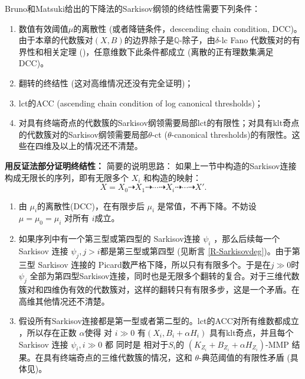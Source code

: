 Bruno和Matsuki\cite{brunoLogSarkisovProgram1995}给出的下降法的Sarkisov纲领的终结性需要下列条件：
\begin{enumerate}
  \item 数值有效阈值$\mu$的离散性 (或者降链条件，descending chain condition, DCC)。由于本章的代数簇对$(X,B)$的边界除子是$\mathbb{Q}$-除子，由$\delta$-lc Fano 代数簇对的有界性和相关定理 (\cite[Theorem 1.1]{birkarSingularitiesLinearSystems2020})，任意维数下此条件都成立 (离散的正有理数集满足DCC)。
  \item 翻转的终结性 (这对高维情况还没有完全证明)； 
  \item lct的ACC (ascending chain condition of log canonical thresholds)；
  \item 对具有终端奇点的代数簇的Sarkisov纲领需要局部lct的有限性；对具有klt奇点的代数簇对的Sarkisov纲领需要局部$\theta$-ct ($\theta$-canonical thresholds)的有限性。这些在四维及以上的情况还不清楚。
\end{enumerate}
\textbf{用反证法部分证明终结性： }
简要的说明思路： 如果上一节中构造的Sarkisov连接构成无限长的序列，即有无限多个 $ X_i $ 和构造的映射：
\[ X=X_0\dashrightarrow X_1\dashrightarrow \cdots\dashrightarrow X_i \dashrightarrow\cdots\dashrightarrow X'.\]
\begin{enumerate}
  \item 由 $\mu_{i}$的离散性(DCC)，在有限步后 $\mu_{i}$ 是常值，不再下降。不妨设 $\mu=\mu_{0}=\mu_{i}$ 对所有 $i$成立。
  \item 如果序列中有一个第三型或第四型的 Sarkisov连接 $\psi_i$ ，那么后续每一个 Sarkisov 连接 $\psi_j, j>i$都是第三型或第四型 (见断言 \ref{R-Sarkisovdeg})。由于第三型 Sarkisov 连接的 Picard数严格下降，所以只有有限多个。于是在$j\gg 0$时 $\psi_j$ 全部为第四型Sarkisov连接，同时也是无限多个翻转的复合。对于三维代数簇对和四维伪有效的代数簇对，这样的翻转只有有限多步，这是一个矛盾。在高维其他情况还不清楚。
  \item 假设所有Sarkisov连接都是第一型或者第二型的。lct的ACC对所有维数都成立 \cite{HMX14}，所以存在正数 $\alpha$使得 对 $i\gg 0$ 有$(X_i,B_i+\alpha H_i)$ 具有klt奇点，并且每个Sarkisov 连接 $\psi_i,i\gg 0$ 都 同时是 相对于$S_{i}$的  $(K_{Z_i}+B_{Z_i}+\alpha H_{Z_i})$-MMP 结果。在具有终端奇点的三维代数簇的情况，这和 $\theta$-典范阈值的有限性矛盾 (具体见\cite[Claim 2.2]{brunoLogSarkisovProgram1995})。
\end{enumerate}

